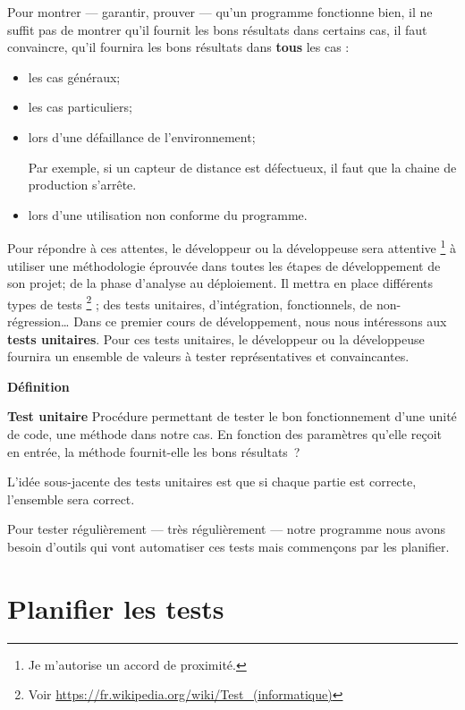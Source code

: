 Pour montrer --- garantir, prouver --- qu'un programme fonctionne bien, il ne
suffit pas de montrer qu'il fournit les bons résultats dans certains cas, il
faut convaincre, qu'il fournira les bons résultats dans \textbf{tous} les cas :

\begin{itemize}
	\item les cas généraux;
	\item les cas particuliers;
	\item lors d'une défaillance de l'environnement;
		
		Par exemple, si un capteur de distance est défectueux, il faut que la 
		chaine de production s'arrête. 
	
	\item lors d'une utilisation non conforme du programme.
\end{itemize}

Pour répondre à ces attentes, le développeur ou la développeuse sera attentive
\footnote{Je m'autorise un accord de proximité.}
à utiliser une méthodologie éprouvée dans toutes les étapes de développement de
son projet; de la phase d'analyse au déploiement.  Il mettra en place différents
types de tests
\footnote{Voir \url{https://fr.wikipedia.org/wiki/Test_(informatique)}}
; des tests unitaires, d'intégration, fonctionnels, de non-régression… Dans ce
premier cours de développement, nous nous intéressons aux \textbf{tests
unitaires}.  Pour ces tests unitaires, le développeur ou la développeuse
fournira un ensemble de valeurs à tester représentatives et convaincantes. 

\textbf{Définition}

\textbf{Test unitaire} Procédure permettant de tester le bon fonctionnement
d'une unité de code, une méthode  dans notre cas. En fonction des
paramètres qu'elle reçoit en entrée, la méthode fournit-elle les bons résultats~? 

L'idée sous-jacente des tests unitaires est que si chaque partie est correcte,
l'ensemble sera correct. 

Pour tester régulièrement --- très régulièrement --- notre programme nous avons
besoin d'outils qui vont automatiser ces tests mais commençons par les
planifier. 


\section{Planifier les tests}

